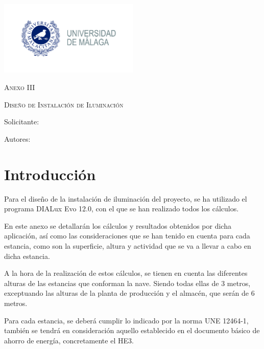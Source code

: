 \documentclass[../main.tex]{subfiles}
\begin{document}
\newpage
\thispagestyle{empty}
\begin{center}
    {\includegraphics[width=0.5\textwidth]{Imagenes/Logo UMA.jpg}\par}
    \vspace{1cm}
    {\bfseries\LARGE \Facultad \par}
    \vspace{0.5cm}
    {\scshape\Large \Grado \par}
    \vspace{1.5cm}
    {\scshape\Huge Anexo III \par}
    \vspace{1.5cm}
    {\scshape\Huge Diseño de Instalación de Iluminación \par}
    \vspace{0.5cm}
    {\itshape\Large \TituloProyecto \par}
    \vfill
    {\Large Solicitante: \par}
    {\Large \Solicitante  \par}
    \vspace{1cm}
    {\Large Autores: \par}
    {\Large \Autora \par}
    {\Large \Autor \par}
    \vfill
    {\Large \Fecha \par}
\end{center}

\newpage
\section{Introducción}
Para el diseño de la instalación de iluminación del proyecto, se ha utilizado el programa DIALux Evo 12.0, con el que se han realizado todos los cálculos. \par
\vspace{0.5 cm}
En este anexo se detallarán los cálculos y resultados obtenidos por dicha aplicación, así como las consideraciones que se han tenido en cuenta para cada estancia, como son la superficie, altura y actividad que se va a llevar a cabo en dicha estancia. \par
\vspace{0.5 cm}
A la hora de la realización de estos cálculos, se tienen en cuenta las diferentes alturas de las estancias que conforman la nave. Siendo todas ellas de 3 metros, exceptuando las alturas de la planta de producción y el almacén, que serán de 6 metros. \par
\vspace{0.5 cm}
Para cada estancia, se deberá cumplir lo indicado por la norma UNE 12464-1, también se tendrá en consideración aquello establecido en el documento básico de ahorro de energía, concretamente el HE3.
\end{document}
